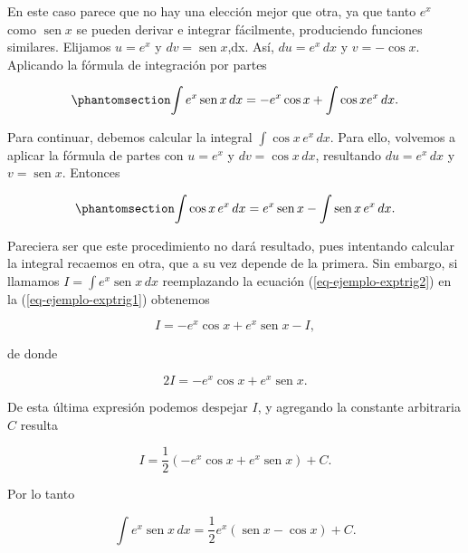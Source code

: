 \documentclass[
  letterpaper,
]{book}
\theoremstyle{plain}
\theoremstyle{remark}
\begin{document}
\begin{tcolorbox}[enhanced jigsaw, opacityback=0, left=2mm, opacitybacktitle=0.6, toprule=.15mm, bottomrule=.15mm, colbacktitle=quarto-callout-tip-color!10!white, titlerule=0mm, bottomtitle=1mm, title=\textcolor{quarto-callout-tip-color}{\faLightbulb}\hspace{0.5em}{Solución}, toptitle=1mm, colframe=quarto-callout-tip-color-frame, colback=white, breakable, rightrule=.15mm, arc=.35mm, leftrule=.75mm, coltitle=black]

En este caso parece que no hay una elección mejor que otra, ya que tanto
\(e^x\) como \(\operatorname{sen} x\) se pueden derivar e integrar
fácilmente, produciendo funciones similares. Elijamos \(u=e^x\) y
\(dv=\operatorname{sen} x\),dx. Así, \(du=e^x\,dx\) y \(v=-\cos x\).
Aplicando la fórmula de integración por partes

\begin{equation}\phantomsection\label{eq-ejemplo-exptrig1}{
\int e^x\operatorname{sen} x\,dx=-e^x\cos x+\int \cos x e^x\,dx.
}\end{equation}

Para continuar, debemos calcular la integral \(\int \cos x\, e^x\,dx\).
Para ello, volvemos a aplicar la fórmula de partes con \(u=e^x\) y
\(dv=\cos x\,dx\), resultando \(du=e^x\,dx\) y
\(v=\operatorname{sen} x\). Entonces

\begin{equation}\phantomsection\label{eq-ejemplo-exptrig2}{
\int \cos x\, e^x\,dx=e^x\operatorname{sen} x-\int \operatorname{sen} x\,e^x\,dx.
}\end{equation}

Pareciera ser que este procedimiento no dará resultado, pues intentando
calcular la integral recaemos en otra, que a su vez depende de la
primera. Sin embargo, si llamamos \(I=\int e^x\operatorname{sen} x\,dx\)
reemplazando la ecuación (\ref{eq-ejemplo-exptrig2}) en la
(\ref{eq-ejemplo-exptrig1}) obtenemos

\[
I=-e^x\cos x+e^x \operatorname{sen} x-I,
\]

de donde

\[
2I=-e^x\cos x+e^x \operatorname{sen} x.
\]

De esta última expresión podemos despejar \(I\), y agregando la
constante arbitraria \(C\) resulta

\[
I=\frac{1}{2}\left(-e^x\cos x+e^x \operatorname{sen} x\right)+C.
\]

Por lo tanto

\[
\int e^x\operatorname{sen} x\,dx=\frac{1}{2}e^x\left(\operatorname{sen} x-\cos x\right)+C.
\]

\end{tcolorbox}
\end{document}
